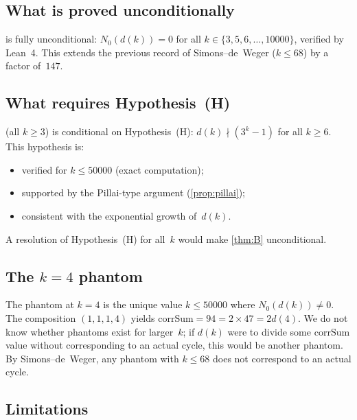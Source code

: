 \documentclass[11pt, a4paper]{amsart}
\theoremstyle{plain}
\theoremstyle{definition}
\theoremstyle{remark}
\newcommand{\corrSum}{\mathrm{corrSum}}
\begin{document}
\subsection{What is proved unconditionally}\label{ssec:unconditional}

 is fully unconditional: $N_0(d(k)) = 0$ for all
$k \in \{3, 5, 6, \ldots, 10000\}$, verified by Lean~4.
This extends the previous record of Simons--de~Weger
($k \leq 68$) by a factor of~$147$.

\subsection{What requires Hypothesis~(H)}\label{ssec:conditional}

 (all $k \geq 3$) is conditional on Hypothesis~(H):
$d(k) \nmid (3^k - 1)$ for all $k \geq 6$.  This hypothesis is:
\begin{itemize}
  \item verified for $k \leq 50000$ (exact computation);
  \item supported by the Pillai-type argument (\cref{prop:pillai});
  \item consistent with the exponential growth of~$d(k)$.
\end{itemize}
A resolution of Hypothesis~(H) for all~$k$ would make
\cref{thm:B} unconditional.

\subsection{The $k=4$ phantom}\label{ssec:phantom}

The phantom at $k = 4$ is the unique value $k \leq 50000$ where
$N_0(d(k)) \neq 0$.  The composition $(1,1,1,4)$ yields
$\corrSum = 94 = 2 \times 47 = 2d(4)$.  We do not know whether
phantoms exist for larger~$k$; if $d(k)$ were to divide some
$\corrSum$ value without corresponding to an actual cycle, this
would be another phantom.  By Simons--de~Weger, any phantom with
$k \leq 68$ does not correspond to an actual cycle.

\subsection{Limitations}\label{ssec:limits}
\end{document}
